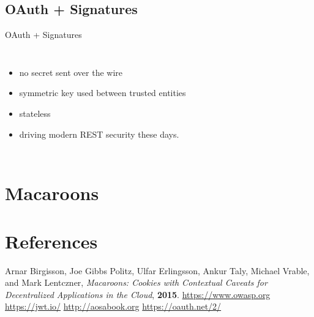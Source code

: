 \documentclass[9pt]{beamer}
\begin{document}

\subsection{OAuth + Signatures}
\begin{frame}{OAuth + Signatures}
  \begin{columns}
    \begin{itemize}
    \item no secret sent over the wire
      \pause
    \item symmetric key used between trusted entities
      \pause
    \item stateless
      \pause
    \item driving modern REST security these days.
    \end{itemize}
  \end{columns}
\end{frame}


\section{Macaroons}
\begin{frame}
\end{frame}

\section{References}
\begin{frame}
  
  \begin{thebibliography}{99}
   Arnar Birgisson, Joe Gibbs Politz, Ulfar Erlingsson, Ankur Taly, Michael Vrable, and Mark Lentczner,  \newblock \emph{Macaroons: Cookies with Contextual Caveats for Decentralized Applications in the Cloud}, \textbf{2015}.
   \href{https://www.owasp.org}{https://www.owasp.org}
   \href{https://jwt.io/}{https://jwt.io/}
   \href{http://aosabook.org}{http://aosabook.org}
   \href{https://oauth.net/2/}{https://oauth.net/2/}
  \end{thebibliography}
\end{frame}

\section{}
\begin{frame}{}
\end{frame}
\end{document}
